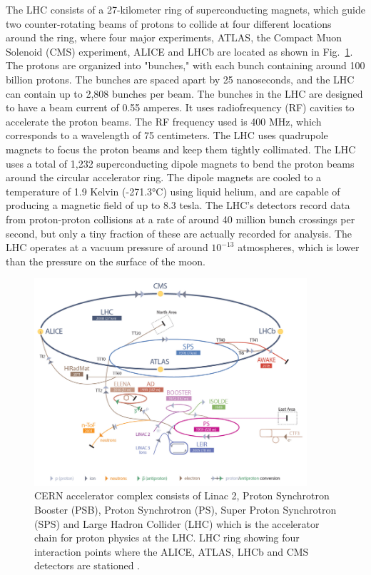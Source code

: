 The LHC consists of a 27-kilometer ring of superconducting magnets, which guide two counter-rotating beams of protons to collide at four different locations around the ring, where four major experiments, ATLAS, the Compact Muon Solenoid (CMS) experiment, ALICE and LHCb are located as shown in Fig.~\ref{fig:lhc}. The protons are organized into "bunches," with each bunch containing around 100 billion protons. The bunches are spaced apart by 25 nanoseconds, and the LHC can contain up to 2,808 bunches per beam. The bunches in the LHC are designed to have a beam current of 0.55 amperes. It uses radiofrequency (RF) cavities to accelerate the proton beams. The RF frequency used is 400 MHz, which corresponds to a wavelength of 75 centimeters. The LHC uses quadrupole magnets to focus the proton beams and keep them tightly collimated. The LHC uses a total of 1,232 superconducting dipole magnets to bend the proton beams around the circular accelerator ring. The dipole magnets are cooled to a temperature of 1.9 Kelvin (-271.3°C) using liquid helium, and are capable of producing a magnetic field of up to 8.3 tesla. The LHC's detectors record data from proton-proton collisions at a rate of around 40 million bunch crossings per second, but only a tiny fraction of these are actually recorded for analysis. The LHC operates at a vacuum pressure of around $10^{-13}$ atmospheres, which is lower than the pressure on the surface of the moon.

\begin{figure}[!htp]
\centering
\includegraphics[width=0.9\textwidth]{ashish_thesis/lhc_schematic.png}
\caption[CERN Accelerator Complex]{%
    CERN accelerator complex consists of Linac 2, Proton Synchrotron Booster (PSB), Proton Synchrotron (PS), Super Proton Synchrotron (SPS) and Large Hadron Collider (LHC) which is the accelerator chain for proton physics at the LHC. LHC ring showing four interaction points where the ALICE, ATLAS, LHCb and CMS detectors are stationed \cite{lhc_complex}.
}
\label{fig:lhc}
\end{figure}

